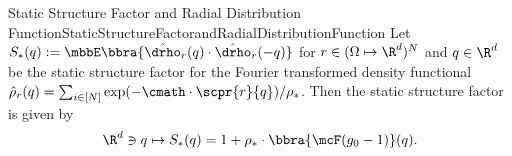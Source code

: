 \begin{mlem}{Static Structure Factor and Radial Distribution Function}{StaticStructureFactorandRadialDistributionFunction}
    Let $S_*(q) := \mbbE\bbra{\hat\drho_r(q)\cdot\hat\drho_r(-q)}$ for $r\in(\Omega\mapsto\R^d)^N$ and $q\in\R^d$ be the static structure factor for the Fourier transformed density functional $\hat\rho_r(q) = \sum_{i\in[N]}\exp(-\cmath\cdot\scpr{r}{q})/\rho_*$. Then the static structure factor is given by%
    \[
        \R^d\ni q\mapsto S_*(q) = 1 + \rho_*\cdot\bbra{\mcF(g_0 - 1)}(q).
    \]
\end{mlem}
